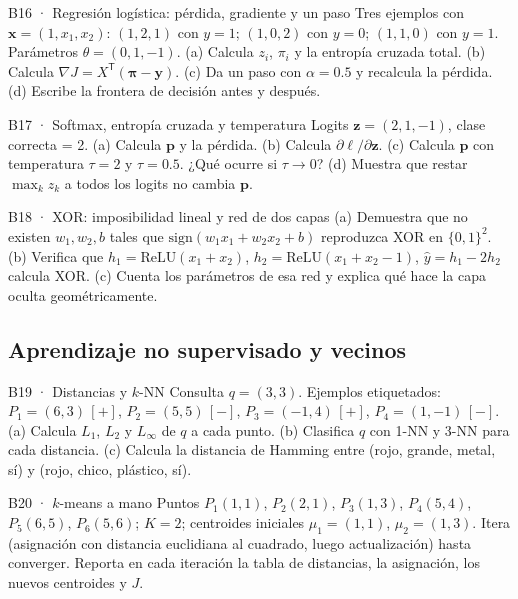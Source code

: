 \begin{ejercicio}{B16 · Regresión logística: pérdida, gradiente y un paso }
Tres ejemplos con $\mathbf x=(1,x_1,x_2)$: $(1,2,1)$ con $y=1$; $(1,0,2)$ con $y=0$; $(1,1,0)$ con $y=1$. Parámetros $\theta=(0,1,-1)$.
(a) Calcula $z_i$, $\pi_i$ y la entropía cruzada total. (b) Calcula $\nabla J=X^\mathsf T(\boldsymbol\pi-\mathbf y)$.
(c) Da un paso con $\alpha=0.5$ y recalcula la pérdida. (d) Escribe la frontera de decisión antes y después.
\end{ejercicio}

\begin{ejercicio}{B17 · Softmax, entropía cruzada y temperatura }
Logits $\mathbf z=(2,1,-1)$, clase correcta = 2.
(a) Calcula $\mathbf p$ y la pérdida. (b) Calcula $\partial\ell/\partial\mathbf z$.
(c) Calcula $\mathbf p$ con temperatura $\tau=2$ y $\tau=0.5$. ¿Qué ocurre si $\tau\to0$?
(d) Muestra que restar $\max_kz_k$ a todos los logits no cambia $\mathbf p$.
\end{ejercicio}

\begin{ejercicio}{B18 · XOR: imposibilidad lineal y red de dos capas }
(a) Demuestra que no existen $w_1,w_2,b$ tales que $\mathrm{sign}(w_1x_1+w_2x_2+b)$ reproduzca XOR en $\{0,1\}^2$.
(b) Verifica que $h_1=\mathrm{ReLU}(x_1+x_2)$, $h_2=\mathrm{ReLU}(x_1+x_2-1)$, $\hat y=h_1-2h_2$ calcula XOR.
(c) Cuenta los parámetros de esa red y explica qué hace la capa oculta geométricamente.
\end{ejercicio}

\subsection{Aprendizaje no supervisado y vecinos}

\begin{ejercicio}{B19 · Distancias y $k$-NN }
Consulta $q=(3,3)$. Ejemplos etiquetados: $P_1=(6,3)\,[+]$, $P_2=(5,5)\,[-]$, $P_3=(-1,4)\,[+]$, $P_4=(1,-1)\,[-]$.
(a) Calcula $L_1$, $L_2$ y $L_\infty$ de $q$ a cada punto. (b) Clasifica $q$ con 1-NN y 3-NN para cada distancia.
(c) Calcula la distancia de Hamming entre (rojo, grande, metal, sí) y (rojo, chico, plástico, sí).
\end{ejercicio}

\begin{ejercicio}{B20 · $k$-means a mano }
Puntos $P_1(1,1)$, $P_2(2,1)$, $P_3(1,3)$, $P_4(5,4)$, $P_5(6,5)$, $P_6(5,6)$; $K=2$; centroides iniciales $\mu_1=(1,1)$, $\mu_2=(1,3)$.
Itera (asignación con distancia euclidiana al cuadrado, luego actualización) hasta converger. Reporta en cada iteración
la tabla de distancias, la asignación, los nuevos centroides y $J$.
\end{ejercicio}

